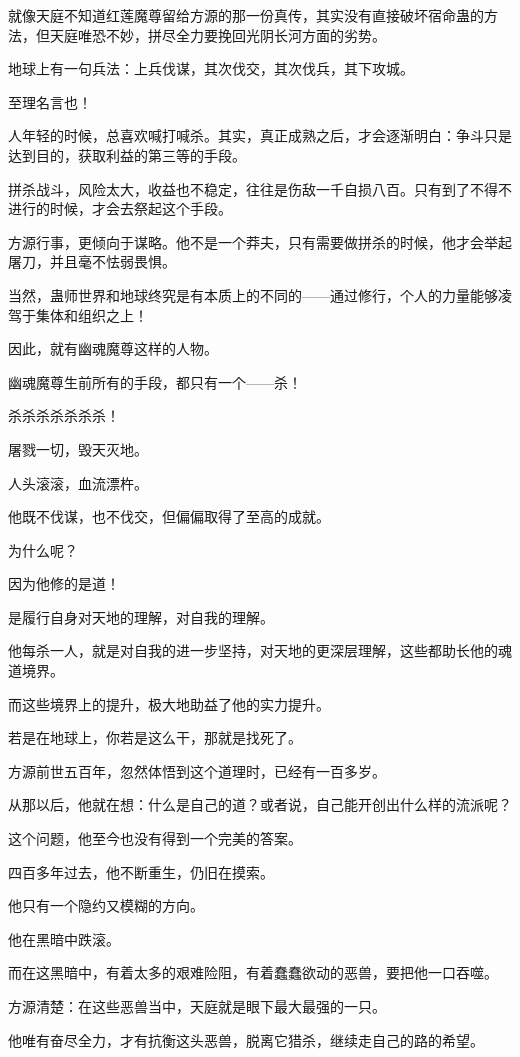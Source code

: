 \begin{this_body}
就像天庭不知道红莲魔尊留给方源的那一份真传，其实没有直接破坏宿命蛊的方法，但天庭唯恐不妙，拼尽全力要挽回光阴长河方面的劣势。

地球上有一句兵法：上兵伐谋，其次伐交，其次伐兵，其下攻城。

至理名言也！

人年轻的时候，总喜欢喊打喊杀。其实，真正成熟之后，才会逐渐明白：争斗只是达到目的，获取利益的第三等的手段。

拼杀战斗，风险太大，收益也不稳定，往往是伤敌一千自损八百。只有到了不得不进行的时候，才会去祭起这个手段。

方源行事，更倾向于谋略。他不是一个莽夫，只有需要做拼杀的时候，他才会举起屠刀，并且毫不怯弱畏惧。

当然，蛊师世界和地球终究是有本质上的不同的——通过修行，个人的力量能够凌驾于集体和组织之上！

因此，就有幽魂魔尊这样的人物。

幽魂魔尊生前所有的手段，都只有一个——杀！

杀杀杀杀杀杀杀！

屠戮一切，毁天灭地。

人头滚滚，血流漂杵。

他既不伐谋，也不伐交，但偏偏取得了至高的成就。

为什么呢？

因为他修的是道！

是履行自身对天地的理解，对自我的理解。

他每杀一人，就是对自我的进一步坚持，对天地的更深层理解，这些都助长他的魂道境界。

而这些境界上的提升，极大地助益了他的实力提升。

若是在地球上，你若是这么干，那就是找死了。

方源前世五百年，忽然体悟到这个道理时，已经有一百多岁。

从那以后，他就在想：什么是自己的道？或者说，自己能开创出什么样的流派呢？

这个问题，他至今也没有得到一个完美的答案。

四百多年过去，他不断重生，仍旧在摸索。

他只有一个隐约又模糊的方向。

他在黑暗中跌滚。

而在这黑暗中，有着太多的艰难险阻，有着蠢蠢欲动的恶兽，要把他一口吞噬。

方源清楚：在这些恶兽当中，天庭就是眼下最大最强的一只。

他唯有奋尽全力，才有抗衡这头恶兽，脱离它猎杀，继续走自己的路的希望。


\end{this_body}
